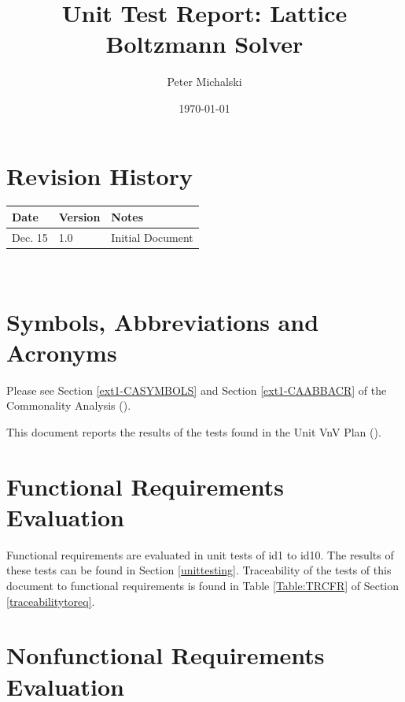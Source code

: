 \documentclass[12pt, titlepage]{article}
\newcommand{\myprogname}{Lattice Boltzmann Solver}
\begin{document}
\title{Unit Test Report: \myprogname} 
\author{Peter Michalski}
\date{\today}
	
\maketitle


\section{Revision History}

\begin{tabularx}{\textwidth}{p{3cm}p{2cm}X}
\toprule {\bf Date} & {\bf Version} & {\bf Notes}\\
\midrule
Dec. 15 & 1.0 & Initial Document\\
\bottomrule
\end{tabularx}

~\newpage

\section{Symbols, Abbreviations and Acronyms}

Please see Section \ref{ext1-CASYMBOLS} and Section \ref{ext1-CAABBACR} of the Commonality Analysis (\citet{LBM_CA_PM}).

\newpage

\tableofcontents

\listoftables %

\listoffigures %

\newpage


This document reports the results of the tests found in the Unit VnV Plan (\citet{LBM_UVNV_PM}).

\section{Functional Requirements Evaluation}

Functional requirements are evaluated in unit tests of id1 to id10. The results of these tests can be found in Section \ref{unittesting}. Traceability of the tests of this document to functional requirements is found in Table \ref{Table:TRCFR} of Section \ref{traceabilitytoreq}. 



\section{Nonfunctional Requirements Evaluation}
\end{document}
